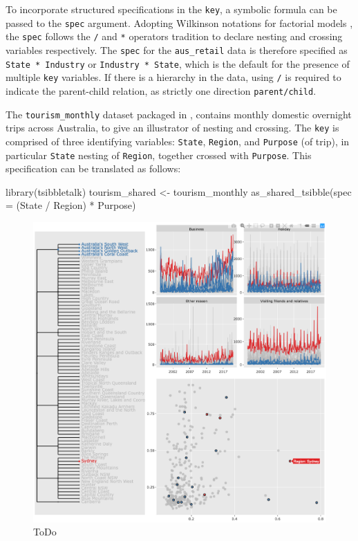 To incorporate structured specifications in the \texttt{key}, a symbolic
formula can be passed to the \texttt{spec} argument. Adopting Wilkinson
notations for factorial models \citep{Wilkinson1973}, the \texttt{spec}
follows the \texttt{/} and \texttt{*} operators tradition to declare
nesting and crossing variables respectively. The \texttt{spec} for the
\texttt{aus\_retail} data is therefore specified as
\texttt{State\ *\ Industry} or \texttt{Industry\ *\ State}, which is the
default for the presence of multiple \texttt{key} variables. If there is
a hierarchy in the data, using \texttt{/} is required to indicate the
parent-child relation, as strictly one direction \texttt{parent/child}.

The \texttt{tourism\_monthly} dataset packaged in ,
contains monthly domestic overnight trips across Australia, to give an
illustrator of nesting and crossing. The \texttt{key} is comprised of
three identifying variables: \texttt{State}, \texttt{Region}, and
\texttt{Purpose} (of trip), in particular \texttt{State} nesting of
\texttt{Region}, together crossed with \texttt{Purpose}. This
specification can be translated as follows:

\begin{Schunk}
\begin{Sinput}
library(tsibbletalk)
tourism_shared <- tourism_monthly %
  as_shared_tsibble(spec = (State / Region) * Purpose)
\end{Sinput}
\end{Schunk}

\begin{Schunk}
\begin{figure}

{\centering \includegraphics[width=\textwidth]{img/tourism-linking} 

}

\caption[ToDo]{ToDo}\label{fig:tourism-linking-fig}
\end{figure}
\end{Schunk}

